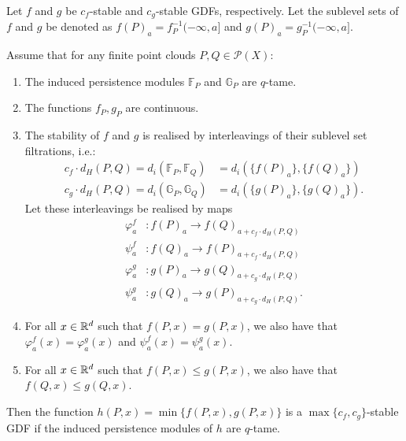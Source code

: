 \begin{theorem}
    Let $f$ and $g$ be $c_f$-stable and $c_g$-stable GDFs, respectively.
    Let the sublevel sets of $f$ and $g$ be denoted as
    $f(P)_a = f^{-1}_P(-\infty, a]$ and $g(P)_a = g^{-1}_P(-\infty, a]$.

    Assume that for any finite point clouds $P, Q \in \mathcal{P}(X)$:
    \begin{enumerate}
        \item The induced persistence modules $\mathbb{F}_P$ and $\mathbb{G}_P$
        are $q$-tame.
        \item The functions $f_P, g_P$ are continuous.
        \item The stability of $f$ and $g$ is realised by interleavings of their
        sublevel set filtrations, i.e.:
        \begin{align}
            c_f \cdot d_H(P, Q) = d_i(\mathbb{F}_P, \mathbb{F}_Q) &= d_i(\{f(P)_a\}, \{f(Q)_a\}) \\
            c_g \cdot d_H(P, Q) = d_i(\mathbb{G}_P, \mathbb{G}_Q) &= d_i(\{g(P)_a\}, \{g(Q)_a\}).
        \end{align}
        Let these interleavings be realised by maps
        \begin{align}
            \varphi^f_a & : f(P)_a \to f(Q)_{a + c_f \cdot d_H(P, Q)} \\
            \psi^f_a & : f(Q)_a \to f(P)_{a + c_f \cdot d_H(P, Q)} \\
            \varphi^g_a & : g(P)_a \to g(Q)_{a + c_g \cdot d_H(P, Q)} \\
            \psi^g_a & : g(Q)_a \to g(P)_{a + c_g \cdot d_H(P, Q)}.
        \end{align}
        \item \label{item:min_agree} For all $x \in \mathbb{R}^d$ such that $f(P, x) =
        g(P, x)$, we also have that $\varphi_a^f(x) = \varphi_a^g(x)$ and
        $\psi_a^f(x) = \psi_a^g(x)$.
        \item \label{item:min_monotone} For all $x \in \mathbb{R}^d$ such that $f(P, x)
        \leq g(P, x)$, we also have that $f(Q, x) \leq g(Q, x)$.
    \end{enumerate}
    Then the function $h(P, x) = \min\{f(P, x), g(P, x)\}$ is
    a $\max\{c_f, c_g\}$-stable GDF if the induced persistence modules of $h$
    are $q$-tame.
\end{theorem}
